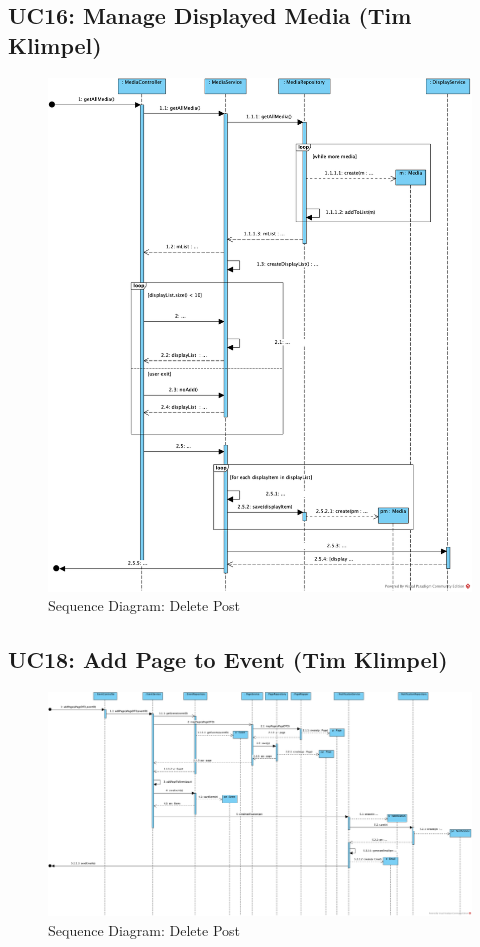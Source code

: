 \documentclass{article}
\begin{document}
\subsection{UC16: Manage Displayed Media (Tim Klimpel)}
\begin{figure}[H]
    \centering
    \includegraphics[width=.98\textwidth]{images/SD - UC16 Manage Displayed Media.png}
    \centering
    \caption{Sequence Diagram: Delete Post}
\end{figure}
\subsection{UC18: Add Page to Event (Tim Klimpel)}
\begin{figure}[H]
    \centering
    \includegraphics[width=.98\textwidth]{images/SD - UC18 Add page to event.png}
    \centering
    \caption{Sequence Diagram: Delete Post}
\end{figure}
\end{document}
